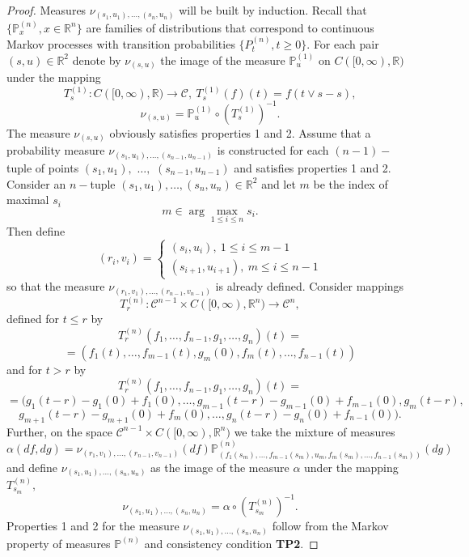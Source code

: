 \documentclass[a4paper,12pt]{article}
\newcommand{\1}{1\!\!\,{\rm I}}
\theoremstyle{plain}
\begin{document}
\begin{proof}
	Measures $\nu_{(s_1,u_1),\ldots,(s_n,u_n)}$ will be built by induction. Recall that $\{\mathbb{P}^{(n)}_x,x\in\mathbb{R}^n\}$ are families of distributions that correspond to continuous Markov processes with transition probabilities $\{P^{(n)}_t,t\geq 0\}.$ For each pair $(s,u)\in \mathbb{R}^2$ denote by $\nu_{(s,u)}$ the image of the measure $\mathbb{P}^{(1)}_u$ on $C([0,\infty),\mathbb{R})$ under  the mapping
	$$
	T^{(1)}_{s}:C([0,\infty),\mathbb{R})\to \mathcal{C}, \ T^{(1)}_{s}(f)(t)=f(t\vee s-s),
	$$
	$$
	\nu_{(s,u)}=\mathbb{P}^{(1)}_u \circ (T^{(1)}_{s})^{-1}.
	$$
	The measure $\nu_{(s,u)}$ obviously satisfies properties 1 and 2.
	Assume that a probability measure $\nu_{(s_1,u_1),\ldots,(s_{n-1},u_{n-1})}$ is constructed for each $(n-1)-$tuple of points $(s_1,u_1),$ $\ldots,$ $(s_{n-1},u_{n-1})$ and satisfies properties 1 and 2. Consider an $n-$tuple $(s_1,u_1),\ldots,(s_{n},u_{n})\in \mathbb{R}^2$ and let $m$ be the index of maximal  $s_i$
	$$
	m\in \arg\max_{1\leq i\leq n}s_i.
	$$
	Then define 
	$$
	(r_i,v_i)=\begin{cases}
	(s_i,u_i), \ 1\leq i\leq m-1 \\
	(s_{i+1},u_{i+1}), \ m\leq i\leq n-1
	\end{cases}
	$$
	so that the measure $\nu_{(r_1,v_1),\ldots,(r_{n-1},v_{n-1})}$ is already defined. Consider mappings
	$$
	T^{(n)}_r:\mathcal{C}^{n-1}\times C([0,\infty),\mathbb{R}^n)\to \mathcal{C}^n,
	$$
	defined for $t\leq r$ by
	$$
	T^{(n)}_r(f_1,\ldots,f_{n-1},g_1,\ldots,g_n)(t)=
	$$
	$$
	=(f_1(t),\ldots,f_{m-1}(t),g_m(0),f_{m}(t),\ldots,f_{n-1}(t))
	$$
	and for $t> r$ by
	$$
	T^{(n)}_r(f_1,\ldots,f_{n-1},g_1,\ldots,g_n)(t)=
	$$
	$$
	=(g_1(t-r)-g_1(0)+f_1(0),\ldots,g_{m-1}(t-r)-g_{m-1}(0)+f_{m-1}(0),g_m(t-r),
	$$
	$$
	g_{m+1}(t-r)-g_{m+1}(0)+f_{m}(0),\ldots,g_{n}(t-r)-g_{n}(0)+f_{n-1}(0)).
	$$
	Further, on the space $\mathcal{C}^{n-1}\times C([0,\infty),\mathbb{R}^n)$ we take the mixture of measures
	$$
	\alpha(df,dg)=\nu_{(r_1,v_1),\ldots,(r_{n-1},v_{n-1})}(df)\mathbb{P}^{(n)}_{(f_1(s_m),\ldots,f_{m-1}(s_m),u_m,f_{m}(s_m),\ldots,f_{n-1}(s_m))}(dg)
	$$
	and define $\nu_{(s_1,u_1),\ldots,(s_{n},u_{n})}$ as the image of the measure $\alpha$ under the mapping $T^{(n)}_{s_m},$
	$$
	\nu_{(s_1,u_1),\ldots,(s_{n},u_{n})}=\alpha\circ (T^{(n)}_{s_m})^{-1}.
	$$
	Properties 1 and 2 for the measure $\nu_{(s_1,u_1),\ldots,(s_n,u_n)}$ follow from the Markov property of measures $\mathbb{P}^{(n)}$ and consistency condition {\bf TP2}.
	
\end{proof}
\end{document}
